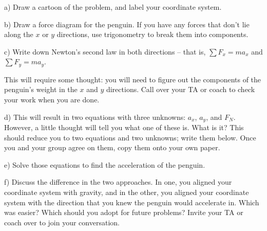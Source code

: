 \documentclass[12pt]{article}
\begin{document}
a) Draw a cartoon of the problem, and label your coordinate system. 

\vspace{2.5in}

b) Draw a force diagram for the penguin.  If you have any forces that don't lie along the $x$ or $y$ directions, use trigonometry to break them into components. 


\newpage

c) Write down Newton's second law in both directions -- that is, $\sum F_x = ma_x$ and $\sum F_y = ma_y$. 

This will require some thought: you will need to figure out the components of the 
penguin's weight in the $x$ and $y$ directions. Call over your TA or coach to check your work when you are done.

\vspace{3in}


d) This will result in two equations with three unknowns: $a_x$, $a_y$, and $F_N$. However, a little thought will
tell you what one of these is. What is it? This should reduce you to two equations and two unknowns; write them below. Once you and your group agree on them, copy them onto your own paper.

\vspace{2in}
\newpage
e) Solve those equations to find the acceleration of the penguin.

\vspace{2in}

f) Discuss the difference in the two approaches. In one, you aligned your coordinate system with gravity, and in the other, you aligned your coordinate system with the direction that you knew the penguin would accelerate in. Which was easier? Which 
should you adopt for future problems? Invite your TA or coach over to join your conversation.
\end{document}
